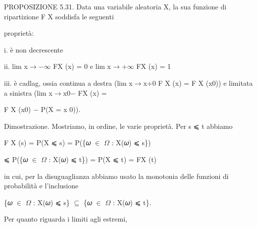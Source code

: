 \documentclass[a4paper,portrait,12pt]{article}
\begin{document}
\begin{flushleft}
PROPOSIZIONE 5.31. Data una variabile aleatoria X, la sua funzione di ripartizione F X soddisfa le seguenti
\end{flushleft}


\begin{flushleft}
propriet\`{a}:
\end{flushleft}


\begin{flushleft}
i. \`{e} non decrescente
\end{flushleft}


\begin{flushleft}
ii. lim x$\rightarrow$$-$$\infty$ FX (x) = 0 e lim x$\rightarrow$+$\infty$ FX (x) = 1
\end{flushleft}


\begin{flushleft}
iii. \`{e} cadlag, ossia continua a destra (lim x$\rightarrow$x+0 F X (x) = F X (x0)) e limitata a sinistra (lim x$\rightarrow$x0$-$ FX (x) =
\end{flushleft}


\begin{flushleft}
F X (x0) $-$ P(X = x 0)).
\end{flushleft}


\begin{flushleft}
Dimostrazione. Mostriamo, in ordine, le varie propriet\`{a}. Per s ⩽ t abbiamo
\end{flushleft}


\begin{flushleft}
F X (s) = P(X ⩽ s) = P(\{𝜔 $\in$ $\Omega$ : X(𝜔) ⩽ s\})
\end{flushleft}


\begin{flushleft}
⩽ P(\{𝜔 $\in$ $\Omega$ : X(𝜔) ⩽ t\}) = P(X ⩽ t) = FX (t)
\end{flushleft}


\begin{flushleft}
in cui, per la disuguaglianza abbiamo usato la monotonia delle funzioni di probabilit\`{a} e l'inclusione
\end{flushleft}


\begin{flushleft}
\{𝜔 $\in$ $\Omega$ : X(𝜔) ⩽ s\} $\subseteq$ \{𝜔 $\in$ $\Omega$ : X(𝜔) ⩽ t\}.
\end{flushleft}


\begin{flushleft}
Per quanto riguarda i limiti agli estremi,
\end{flushleft}
\end{document}
